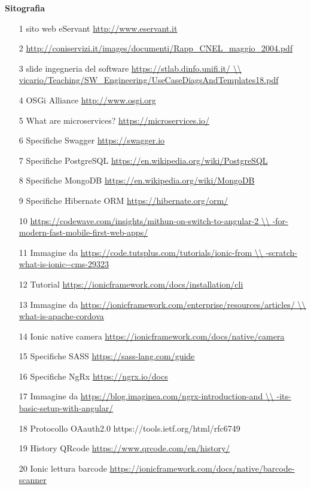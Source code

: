 \textbf{Sitografia}
\begin{itemize}
\item [1] sito web eServant \url{http://www.eservant.it}
\item [2] \url{http://coniservizi.it/images/documenti/Rapp_CNEL_maggio_2004.pdf}
\item [3] slide ingegneria del software \url{https://stlab.dinfo.unifi.it/ \\
vicario/Teaching/SW_Engineering/UseCaseDiagsAndTemplates18.pdf}
\item [4] OSGi Alliance \url{http://www.osgi.org}
\item [5] What are microservices? \url{https://microservices.io/}
\item [6] Specifiche Swagger \url{https://swagger.io}
\item [7] Specifiche PostgreSQL \url{https://en.wikipedia.org/wiki/PostgreSQL}
\item [8] Specifiche MongoDB \url{https://en.wikipedia.org/wiki/MongoDB}
\item [9] Specifiche Hibernate ORM \url{https://hibernate.org/orm/}
\item [10] \url{https://codewave.com/insights/mithun-on-switch-to-angular-2 \\
-for-modern-fast-mobile-first-web-apps/}
\item [11] Immagine da \url{https://code.tutsplus.com/tutorials/ionic-from \\
-scratch-what-is-ionic--cms-29323}
\item [12] Tutorial \url{https://ionicframework.com/docs/installation/cli}
\item [13] Immagine da \url{https://ionicframework.com/enterprise/resources/articles/ \\
what-is-apache-cordova}
\item [14] Ionic native camera \url{https://ionicframework.com/docs/native/camera}
\item [15] Specifiche SASS \url{https://sass-lang.com/guide}
\item [16] Specifiche NgRx \url{https://ngrx.io/docs}
\item [17] Immagine da \url{https://blog.imaginea.com/ngrx-introduction-and \\
-its-basic-setup-with-angular/}
\item [18] Protocollo OAauth2.0 https://tools.ietf.org/html/rfc6749
\item [19] History QRcode \url{https://www.qrcode.com/en/history/}
\item [20] Ionic lettura barcode \url{https://ionicframework.com/docs/native/barcode-scanner}

\end{itemize}
